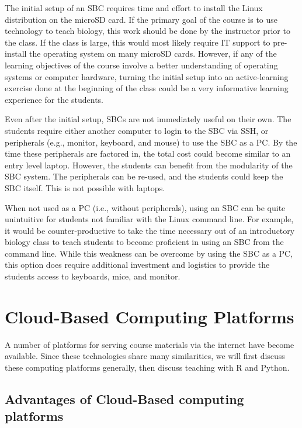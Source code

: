The initial setup of an SBC requires time and effort to install the
Linux distribution on the microSD card.
If the primary goal of the course is to use technology to teach biology,
this work should be done by the instructor prior to the class.
If the class is large, this would most likely require IT support to pre-install
the operating system on many microSD cards.
However, if any of the learning objectives of the course involve
a better understanding of operating systems or computer hardware,
turning the initial setup into an active-learning exercise done
at the beginning of the class could be a very informative
learning experience for the students.

Even after the initial setup, SBCs are not immediately useful on their own.
The students require either another computer to login to the SBC via SSH, or
peripherals (e.g., monitor, keyboard, and mouse) to use the SBC as a PC.
By the time these peripherals are factored in, the total cost could become
similar to an entry level laptop.
However, the students can benefit from the modularity of the SBC system.
The peripherals can be re-used, and the students could keep the SBC itself.
This is not possible with laptops.

When not used as a PC (i.e., without peripherals), using an SBC can be
quite unintuitive for students not familiar with the Linux command line.
For example, it would be counter-productive to take the time necessary
out of an introductory biology class to teach students to become proficient
in using an SBC from the command line.
While this weakness can be overcome by using the SBC as a PC, this option does
require additional investment and logistics to provide the students access to
keyboards, mice, and monitor.


\section{Cloud-Based Computing Platforms}

A number of platforms for serving course materials via the internet have become available. 
Since these technologies share many similarities, we will first discuss these computing platforms generally,
then discuss teaching with R and Python.


\subsection{Advantages of Cloud-Based computing platforms}\label{subsub:cloud-advantage}

